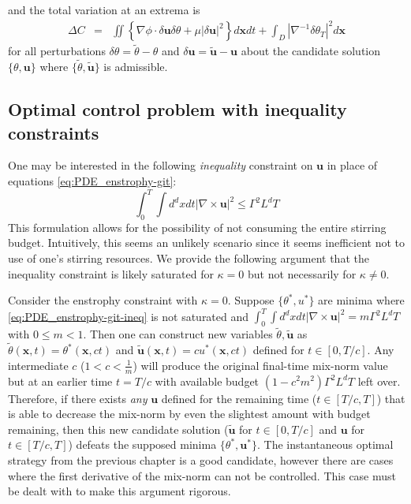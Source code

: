 %
and the total variation at an extrema is 
  \begin{eqnarray}
  	\label{eq:total_Variation_energy}
 	\Delta C&=& \iint \left\{\nabla\phi\cdot\delta\mathbf{u}\delta \theta 
			 +\mu |\delta \mathbf{u}|^{2}  
  		\right\}d\mathbf{x}dt +\int_{D}
  			|\nabla^{-1} 
			\delta\theta_{T}|^{2}
	      d\mathbf{x}
\end{eqnarray}
for all perturbations $\delta\theta = \tilde{\theta}-\theta$ and $\delta \mathbf{u} = \tilde{\mathbf{u}}-\mathbf{u}$ about the candidate solution $\{\theta,\mathbf{u}\}$ where $\{\tilde{\theta},\tilde{\mathbf{u}}\}$ is admissible. 
%
\subsection{Optimal control problem with inequality constraints}
One may be interested in the following {\it inequality} constraint on $\mathbf{u}$ in place of equations \eqref{eq:PDE_enstrophy-git}:
%
\begin{equation}
	\label{eq:PDE_enstrophy-git-ineq}
	\int_{0}^{T}\int d^{d}x dt |\nabla \times \mathbf{u}|^{2} \leq \Gamma^2 L^{d}T
\end{equation}
%
This formulation allows for the possibility of not consuming the entire stirring budget. Intuitively, this seems an unlikely scenario since it seems inefficient not to use of one's stirring resources. We provide the following argument that the inequality constraint is likely saturated for $\kappa = 0$ but not necessarily for $\kappa \neq 0$.

Consider the enstrophy constraint with $\kappa = 0$. Suppose $\{\theta^{*}, u^{*}\}$ are minima where \eqref{eq:PDE_enstrophy-git-ineq} is not saturated and $\int_{0}^{T}\int d^{d}x dt |\nabla \times \mathbf{u}|^{2} = m \Gamma^2 L^{d}T$ with $0\leq m <1$. Then one can construct new variables $\tilde{\theta},\tilde{\mathbf{u}}$ as  $\tilde{\theta}(\mathbf{x},t) = \theta^{*}(\mathbf{x},ct)$ and $\tilde{\mathbf{u}}(\mathbf{x},t) =c u^{*}(\mathbf{x},ct)$ defined for $t\in [0,T/c]$.  Any intermediate $c$ ($1< c < \frac{1}{m}$) will produce the original final-time mix-norm value but at an earlier time $t= T/c$ with available budget $(1-c^2m^2)\Gamma^2L^dT$ left over. Therefore, if there exists {\it any} $\mathbf{u}$ defined for the remaining time ($t\in [T/c,T]$) that is able to decrease the mix-norm by even the slightest amount with budget remaining, then this new candidate solution ($\tilde{\mathbf{u}}$ for $t\in [0,T/c]$ and  $\mathbf{u}$ for $t\in [T/c,T]$) defeats the supposed minima $\{\theta^{*}, \mathbf{u}^{*}\}$.  The instantaneous optimal strategy from the previous chapter is a good candidate, however there are cases where the first derivative of the mix-norm can not be controlled. This case must be dealt with to make this argument rigorous. 

